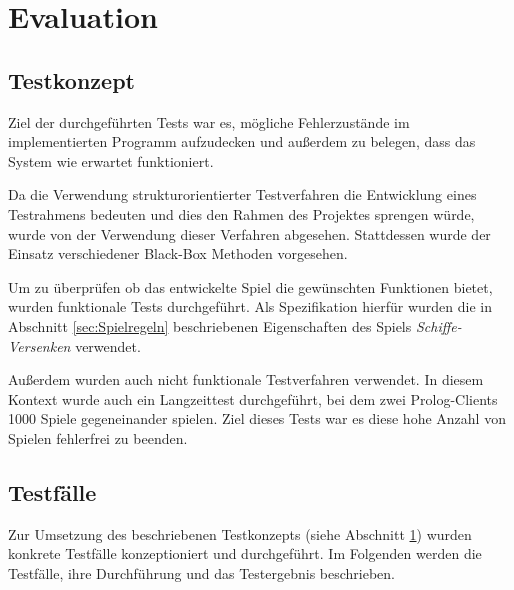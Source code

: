 \section{Evaluation} \label{sec:Evaluation}

\subsection{Testkonzept}

	Ziel der durchgeführten Tests war es, mögliche Fehlerzustände im implementierten Programm aufzudecken und außerdem zu belegen, dass das System
	wie erwartet funktioniert. 
	
	Da die Verwendung strukturorientierter Testverfahren die Entwicklung eines Testrahmens bedeuten und dies den Rahmen des Projektes sprengen würde,
	wurde von der Verwendung dieser Verfahren abgesehen.  
	Stattdessen wurde der Einsatz verschiedener Black-Box Methoden vorgesehen.
	
	Um zu überprüfen ob das entwickelte Spiel die gewünschten Funktionen bietet, wurden funktionale Tests durchgeführt. 
	Als Spezifikation hierfür wurden die in Abschnitt \ref{sec:Spielregeln} beschriebenen Eigenschaften des Spiels \textit{Schiffe-Versenken}
	verwendet. 
	
	
	Außerdem wurden auch nicht funktionale Testverfahren verwendet. In diesem Kontext wurde auch ein Langzeittest durchgeführt, bei dem zwei
	Prolog-Clients 1000 Spiele gegeneinander spielen. Ziel dieses Tests war es diese hohe Anzahl von Spielen fehlerfrei zu beenden. 	
	

\subsection{Testfälle}
	Zur Umsetzung des beschriebenen Testkonzepts (siehe Abschnitt \ref{sec:Evaluation}) wurden konkrete Testfälle konzeptioniert und
	durchgeführt. Im Folgenden werden die Testfälle, ihre Durchführung und das Testergebnis beschrieben. 
	

